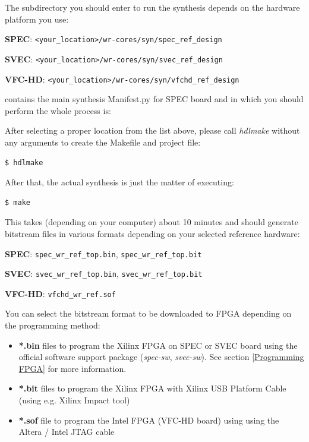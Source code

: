 \documentclass[a4paper, 12pt]{article}
\newcommand{\codeHook}[1]{\mbox{\ttfamily\MakeTextUppercase{#1}}}
\begin{document}
\vspace{1em}
The subdirectory you should enter to run the synthesis depends on the hardware
platform you use:
\begin{itemize*}
  \item \textbf{SPEC}: \texttt{<your\_location>/wr-cores/syn/spec\_ref\_design}
  \item \textbf{SVEC}: \texttt{<your\_location>/wr-cores/syn/svec\_ref\_design}
  \item \textbf{VFC-HD}: \texttt{<your\_location>/wr-cores/syn/vfchd\_ref\_design}
\end{itemize*}
contains the main synthesis Manifest.py for \codeHook{spec} board
and in which you should perform the whole process is:

After selecting a proper location from the list above, please call
\textit{hdlmake} without any arguments to create the Makefile and project file:
\begin{lstlisting}
$ hdlmake
\end{lstlisting}

After that, the actual synthesis is just the matter of executing:
\begin{lstlisting}
$ make
\end{lstlisting}

This takes (depending on your computer) about 10 minutes and should generate
bitstream files in various formats depending on your selected reference
hardware:
\begin{itemize*}
  \item \textbf{SPEC}: \texttt{spec\_wr\_ref\_top.bin}, \texttt{spec\_wr\_ref\_top.bit}
  \item \textbf{SVEC}: \texttt{svec\_wr\_ref\_top.bin}, \texttt{svec\_wr\_ref\_top.bit}
  \item \textbf{VFC-HD}: \texttt{vfchd\_wr\_ref.sof}
\end{itemize*}

You can select the bitstream format to be downloaded to FPGA depending on the
programming method:
\begin{itemize}
  \item \textbf{*.bin} files to program the Xilinx FPGA on SPEC or SVEC board
    using the official software support package (\textit{spec-sw},
    \textit{svec-sw}). See section \ref{Programming FPGA} for more
    information.
  \item \textbf{*.bit} files to program the Xilinx FPGA with Xilinx USB Platform
    Cable (using e.g. Xilinx Impact tool)
  \item \textbf{*.sof} file to program the Intel FPGA (VFC-HD board) using using
    the Altera / Intel JTAG cable
\end{itemize}
\end{document}
